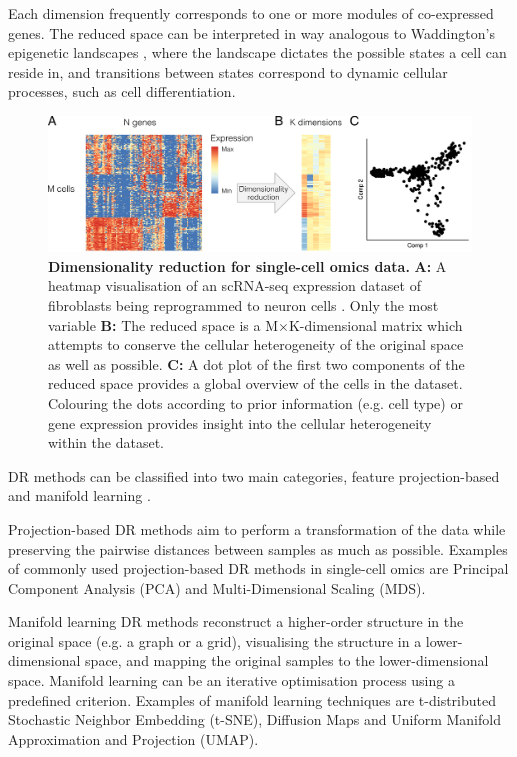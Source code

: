 Each dimension frequently corresponds to one or more modules of co-expressed genes. The reduced space can be interpreted in way analogous to Waddington’s epigenetic landscapes \cite{waddington_strategygenesdiscussion_1957,ferrell_bistabilitybifurcationswaddington_2012,rebhahn_animatedlandscaperepresentation_2014}, where the landscape dictates the possible states a cell can reside in, and transitions between states correspond to dynamic cellular processes, such as cell differentiation. 

\begin{figure}[htb!]
	\centering
	\includegraphics[width=\linewidth]{fig/comptools2/comptool_1_dimred.pdf} 
	\caption{
		\textbf{Dimensionality reduction for single-cell omics data.}
		\textbf{A:} A heatmap visualisation of an scRNA-seq expression dataset of fibroblasts being reprogrammed to neuron cells \cite{treutlein_dissectingdirectreprogramming_2016}. Only the most variable 
		\textbf{B:} The reduced space is a M$\times$K-dimensional matrix which attempts to conserve the cellular heterogeneity of the original space as well as possible.
		\textbf{C:} A dot plot of the first two components of the reduced space provides a global overview of the cells in the dataset. Colouring the dots according to prior information (e.g. cell type) or gene expression provides insight into the cellular heterogeneity within the dataset.
	}
	\label{fig:comp_tools_dimred}
\end{figure}

DR methods can be classified into two main categories, feature projection-based and manifold learning \cite{engel_surveydimensionreduction_2012}. 

Projection-based DR methods aim to perform a transformation of the data while preserving the pairwise distances between samples as much as possible. Examples of commonly used projection-based DR methods in single-cell omics are Principal Component Analysis \cite{pearson_liiilinesplanes_1901} (PCA) and Multi-Dimensional Scaling \cite{kruskal_multidimensionalscalingoptimizing_1964} (MDS). 

Manifold learning DR methods reconstruct a higher-order structure in the original space (e.g. a graph or a grid), visualising the structure in a lower-dimensional space, and mapping the original samples to the lower-dimensional space. Manifold learning can be an iterative optimisation process using a predefined criterion. Examples of manifold learning techniques are t-distributed Stochastic Neighbor Embedding \cite{vandermaaten_visualizingdatausing_2008} (t-SNE), Diffusion Maps \cite{nadler_diffusion_2005,coifman_diffusionmaps_2006} and Uniform Manifold Approximation and Projection \cite{mcinnes_umapuniformmanifold_2018} (UMAP). 

